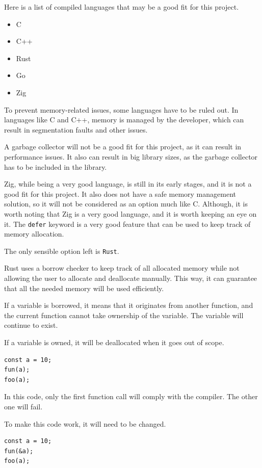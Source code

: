 \documentclass[10pt,journal,compsoc]{IEEEtran}
\begin{document}
Here is a list of compiled languages that may be a good fit for this project.

\begin{itemize}
    \item C
    \item C++
    \item Rust
    \item Go
    \item Zig
\end{itemize}

To prevent memory-related issues, some languages have to be ruled out. In languages like C and C++, memory is managed by the developer, which can result in segmentation faults and other issues. \cite{9793767}

A garbage collector will not be a good fit for this project, as it can result in performance issues. It also can result in big library sizes, as the garbage collector has to be included in the library.

Zig, while being a very good language, is still in its early stages, and it is not a good fit for this project. It also does not have a safe memory management solution, so it will not be considered as an option much like C. Although, it is worth noting that Zig is a very good language, and it is worth keeping an eye on it. The \verb|defer| keyword is a very good feature that can be used to keep track of memory allocation.

The only sensible option left is \verb|Rust|.

Rust uses a borrow checker to keep track of all allocated memory while not allowing the user to allocate and deallocate manually. This way, it can guarantee that all the needed memory will be used efficiently.

If a variable is borrowed, it means that it originates from another function, and the current function cannot take ownership of the variable. The variable will continue to exist.

If a variable is owned, it will be deallocated when it goes out of scope.

\begin{lstlisting}
const a = 10;
fun(a);
foo(a);
\end{lstlisting}

In this code, only the first function call will comply with the compiler. The other one will fail.

To make this code work, it will need to be changed.

\begin{lstlisting}
const a = 10;
fun(&a);
foo(a);
\end{lstlisting}
\end{document}
